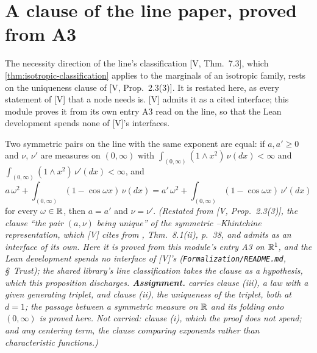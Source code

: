 \section{A clause of the line paper, proved from A3}
\label{sec:cited-line}

The necessity direction of the line's classification [V, Thm.~7.3], which
\ref{thm:isotropic-classification} applies to the marginals of an isotropic family, rests on the
uniqueness clause of [V, Prop.~2.3(3)]. It is restated here, as every statement of [V] that a node
needs is. [V] admits it as a cited interface; this module proves it from its own entry A3 read on
the line, so that the Lean development spends none of [V]'s interfaces.

\begin{proposition}
\label{prop:line-levy-unique}
\leanok
{}
Two symmetric \Levy{} pairs on the line with the same exponent are equal: if $a, a' \ge 0$ and
$\nu$, $\nu'$ are measures on $(0,\infty)$ with $\int_{(0,\infty)}(1 \wedge x^2)\,\nu(dx) < \infty$
and $\int_{(0,\infty)}(1 \wedge x^2)\,\nu'(dx) < \infty$, and
\[
  a\,\omega^2 + \int_{(0,\infty)}(1 - \cos\omega x)\,\nu(dx)
  = a'\,\omega^2 + \int_{(0,\infty)}(1 - \cos\omega x)\,\nu'(dx)
\]
for every $\omega \in \mathbb{R}$, then $a = a'$ and $\nu = \nu'$.
\statusA\quad{}\quad\emph{(Restated from [V, Prop.~2.3(3)], the clause ``the pair
$(a,\nu)$ being unique'' of the symmetric \Levy--Khintchine representation, which [V] cites from
, Thm.~8.1(ii), p.~38, and admits as an interface of its own. Here it is
proved from this module's entry A3 on $\mathbb{R}^1$, and the Lean development spends no interface of [V]'s
(\texttt{Formalization/README.md}, \S~Trust); the shared library's line classification takes the
clause as a hypothesis, which this proposition discharges. \textbf{Assignment.}  carries
clause (iii), a law with a given generating triplet, and clause (ii), the uniqueness of the triplet,
both at $d = 1$; the passage between a symmetric \Levy{} measure on $\mathbb{R}$ and its folding onto
$(0,\infty)$ is proved here. Not carried: clause (i), which the proof does not spend; and any
centering term, the clause comparing exponents rather than characteristic functions.)}
\end{proposition}

